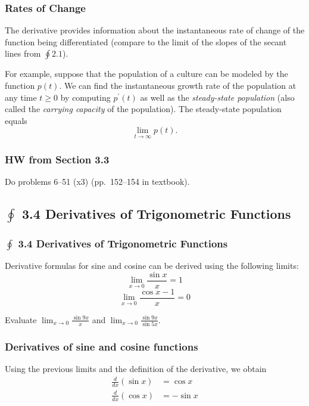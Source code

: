\documentclass[14pt]{beamer}
\begin{document}
\begin{frame}
\frametitle{Rates of Change}
\small
The derivative provides information about the instantaneous rate of change of the function being differentiated (compare to the limit of the slopes of the secant lines from $\oint 2.1$).

\vspace{1pc}
For example, suppose that the population of a culture can be modeled by the function $p(t)$.  We can find the instantaneous growth rate of the population at any time $t \ge 0$ by computing $p^{\prime}(t)$ as well as the \alert{\emph{steady-state population}} (also called the \emph{carrying capacity} of the population).  The steady-state population equals 
$$\lim_{t \to \infty} p(t).$$
\end{frame}

\begin{frame}
\frametitle{HW from Section 3.3}
Do problems 6--51 (x3) (pp.\ 152--154 in textbook).
\end{frame}

\begin{frame}
\subsection[3.4 Derivatives of Trigonometric Functions]{$\oint$ 3.4 Derivatives of Trigonometric Functions}
\frametitle{$\oint$ 3.4 Derivatives of Trigonometric Functions}
Derivative formulas for sine and cosine can be derived using the following limits:
$$\lim_{x \to 0} \frac{\sin x}{x}=1$$
\bigskip
$$\lim_{x \to 0} \frac{\cos x -1}{x}=0$$
\end{frame}

\begin{frame}%
\begin{exe} Evaluate $\displaystyle\lim_{x \to 0} \frac{\sin 9x}{x}$ and $\displaystyle\lim_{x \to 0} \frac{\sin 9x}{\sin 5x}.$ \end{exe}
\end{frame}

\begin{frame}

\frametitle{Derivatives of sine and cosine functions}

Using the previous limits and the definition of the derivative, we obtain
\begin{align*}
\frac{d}{dx} (\sin x) &= \cos x \\
\frac{d}{dx} (\cos x) &= -\sin x
\end{align*}

\end{frame}
\end{document}

